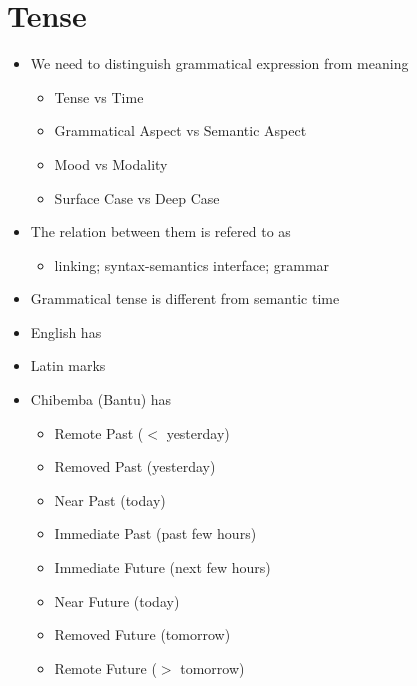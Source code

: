 \documentclass[headrule,footrule]{foils}
\begin{document}
\section{Tense}

\begin{center}
  \LARGE {}
\end{center}
\begin{itemize}
\item  We need to distinguish grammatical expression from 
  meaning
  \begin{itemize}
  \item  Tense vs Time
  \item  Grammatical Aspect vs Semantic Aspect
  \item  Mood vs Modality
  \item  Surface Case vs Deep Case
  \end{itemize}
\item  The relation between them is refered to as
  \begin{itemize}
  \item  linking; syntax-semantics interface; grammar
  \end{itemize}
\end{itemize} 
 

\begin{itemize}
\item  Grammatical tense is different from semantic time
\item  English has 
\item  Latin marks 
\item  Chibemba (Bantu) has 
  \begin{multicols}{2}
  \begin{itemize}
  \item  Remote Past ($<$ yesterday)
  \item  Removed Past (yesterday)
  \item  Near Past (today)
  \item  Immediate Past (past few hours)
  \item Immediate Future (next few hours)
  \item Near Future (today)
  \item Removed Future (tomorrow)
  \item Remote Future ($>$ tomorrow)
  \end{itemize}
\end{multicols}
\end{itemize}
\end{document}
